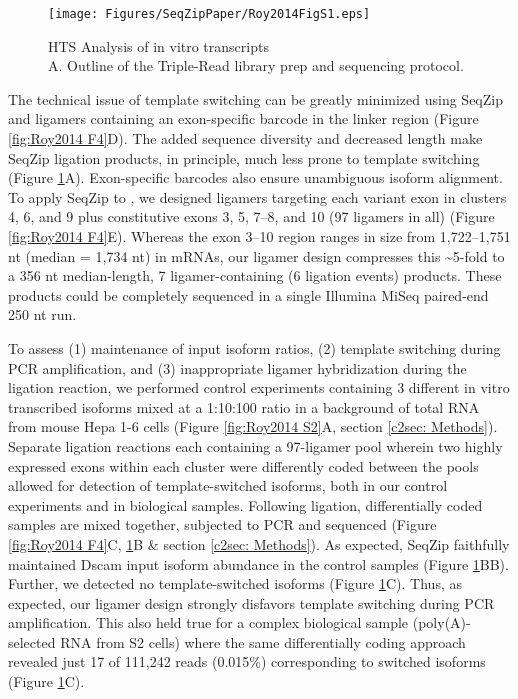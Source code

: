 {		\begin{figure}[htbp] %
			\centering 
			\texttt{[image: Figures/SeqZipPaper/Roy2014FigS1.eps]}
			\caption[HTS Analysis of \dscam{} in vitro transcripts]
			{
				HTS Analysis of \dscam{} in vitro transcripts\\
				 A. Outline of the Triple-Read library prep and sequencing protocol.
				}
			\label{fig:Roy2014 S1}
			\end{figure}

		The technical issue of template switching can be greatly minimized using SeqZip and ligamers containing an exon-specific barcode in the linker region (Figure \ref{fig:Roy2014 F4}D). The added sequence diversity and decreased length make SeqZip ligation products, in principle, much less prone to template switching (Figure \ref{fig:Roy2014 S1}A). Exon-specific barcodes also ensure unambiguous isoform alignment. To apply SeqZip to \dscam{}, we designed ligamers targeting each variant exon in clusters 4, 6, and 9 plus constitutive exons 3, 5, 7–8, and 10 (97 ligamers in all) (Figure \ref{fig:Roy2014 F4}E). Whereas the exon 3–10 region ranges in size from 1,722–1,751 nt (median = 1,734 nt) in \dscam{} mRNAs, our ligamer design compresses this \textasciitilde 5-fold to a 356 nt median-length, 7 ligamer-containing (6 ligation events) products. These products could be completely sequenced in a single Illumina MiSeq paired-end 250 nt run.

		To assess (1) maintenance of input isoform ratios, (2) template switching during PCR amplification, and (3) inappropriate ligamer hybridization during the ligation reaction, we performed control experiments containing 3 different in vitro transcribed \dscam{} isoforms mixed at a 1:10:100 ratio in a background of total RNA from mouse Hepa 1-6 cells (Figure \ref{fig:Roy2014 S2}A, section \ref{c2sec: Methods}). Separate ligation reactions each containing a 97-ligamer pool wherein two highly expressed exons within each cluster were differently coded between the pools allowed for detection of template-switched isoforms, both in our control experiments and in biological samples. Following ligation, differentially coded samples are mixed together, subjected to PCR and sequenced (Figure \ref{fig:Roy2014 F4}C, \ref{fig:Roy2014 S1}B \& section \ref{c2sec: Methods}).  As expected, SeqZip faithfully maintained Dscam input isoform abundance in the control samples (Figure \ref{fig:Roy2014 S1}BB). Further, we detected no template-switched isoforms (Figure \ref{fig:Roy2014 S1}C). Thus, as expected, our ligamer design strongly disfavors template switching during PCR amplification. This also held true for a complex biological sample (poly(A)-selected RNA from S2 cells) where the same differentially coding approach revealed just 17 of 111,242 reads (0.015\%) corresponding to switched isoforms (Figure \ref{fig:Roy2014 S1}C).

}
